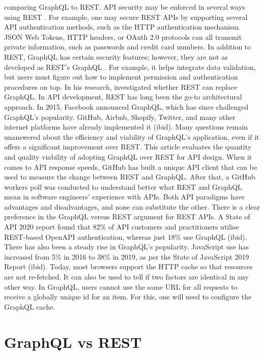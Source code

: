 comparing GraphQL to REST. API security may be enforced in several ways using
REST \citep{vadlamaniCanGraphQLReplace2021}. For example, one may secure REST
APIs by supporting several API authentication methods, such as the HTTP
authentication mechanism. JSON Web Tokens, HTTP headers, or OAuth 2.0 protocols
can all transmit private information, such as passwords and credit card numbers.
In addition to REST, GraphQL has certain security features; however, they are
not as developed as REST's GraphQL \citep{lawiEvaluatingGraphQLREST2021}. For
example, it helps integrate data validation, but users must figure out how to
implement permission and authentication procedures on top. In his research,
\citet{vadlamaniCanGraphQLReplace2021} investigated whether REST can replace
GraphQL. In API development, REST has long been the go-to architectural approach.
In 2015, Facebook announced GraphQL, which has since challenged GraphQL's
popularity. GitHub, Airbnb, Shopify, Twitter, and many other internet platforms
have already implemented it (ibid). Many questions remain unanswered about the
efficiency and viability of GraphQL's application, even if it offers a
significant improvement over REST. This article evaluates the quantity and
quality viability of adopting GraphQL over REST for API design. When it comes to
API response speeds, GitHub has built a unique API client that can be used to
measure the change between REST and GraphQL. After that, a GitHub workers poll
was conducted to understand better what REST and GraphQL mean in software
engineers' experience with APIs. Both API paradigms have advantages and
disadvantages, and none can substitute the other. There is a clear preference in
the GraphQL versus REST argument for REST APIs. A State of API 2020 report found
that 82\% of API customers and practitioners utilise REST-based OpenAPI
authentication, whereas just 18\% use GraphQL (ibid). There has also been a
steady rise in GraphQL's popularity. JavaScript use has increased from 5\%
in 2016 to 38\% in 2019, as per the State of JavaScript 2019 Report
(ibid). Today, most browsers support the HTTP cache so that resources are not
re-fetched. It can also be used to tell if two factors are identical in any
other way. In GraphQL, users cannot use the same URL for all requests to receive
a globally unique id for an item. For this, one will need to configure the
GraphQL cache.

\section{GraphQL vs REST}
\label{s:GraphQLvsRest}

